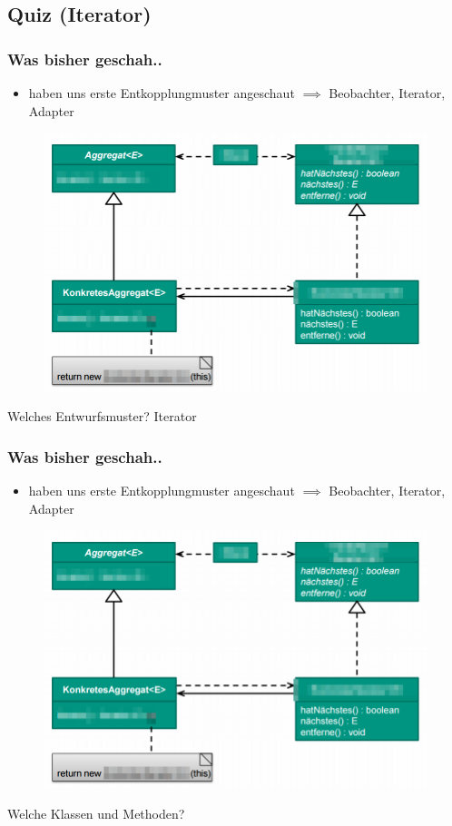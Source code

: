 \documentclass[18pt]{beamer}
\begin{document}
	\subsection{Quiz (Iterator)}
	\begin{frame}
		\frametitle{Was bisher geschah..}
		\begin{itemize}
			\item haben uns erste Entkopplungmuster angeschaut
			\linebreak $\implies$ Beobachter, Iterator, Adapter
		\end{itemize}
		\begin{figure}
			\includegraphics[scale=0.25]{./pics/tut4/iter-mod.png}
		\end{figure}
		Welches Entwurfsmuster? \pause Iterator
	\end{frame}
	
	\begin{frame}
		\frametitle{Was bisher geschah..}
		\begin{itemize}
			\item haben uns erste Entkopplungmuster angeschaut
			\linebreak $\implies$ Beobachter, Iterator, Adapter
		\end{itemize}
		\begin{figure}
			\includegraphics[scale=0.25]{./pics/tut4/iter-mod.png}
		\end{figure}
		Welche Klassen und Methoden?
	\end{frame}
	
\end{document}
